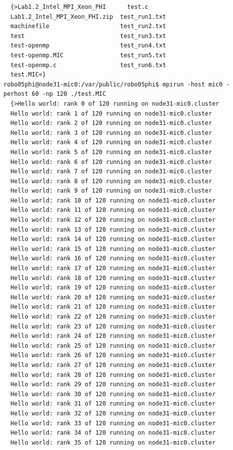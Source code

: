 \documentclass[pscyr,10pt]{hedlab}
\begin{document}
\begin{lstlisting}
  {>Lab1.2_Intel_MPI_Xeon_PHI      test.c
  Lab1.2_Intel_MPI_Xeon_PHI.zip  test_run1.txt
  machinefile                    test_run2.txt
  test                           test_run3.txt
  test-openmp                    test_run4.txt
  test-openmp.MIC                test_run5.txt
  test-openmp.c                  test_run6.txt
  test.MIC<}
robo05phi@node31-mic0:/var/public/robo05phi$ mpirun -host mic0 -perhost 60 -np 120 ./test.MIC
  {>Hello world: rank 0 of 120 running on node31-mic0.cluster
  Hello world: rank 1 of 120 running on node31-mic0.cluster
  Hello world: rank 2 of 120 running on node31-mic0.cluster
  Hello world: rank 3 of 120 running on node31-mic0.cluster
  Hello world: rank 4 of 120 running on node31-mic0.cluster
  Hello world: rank 5 of 120 running on node31-mic0.cluster
  Hello world: rank 6 of 120 running on node31-mic0.cluster
  Hello world: rank 7 of 120 running on node31-mic0.cluster
  Hello world: rank 8 of 120 running on node31-mic0.cluster
  Hello world: rank 9 of 120 running on node31-mic0.cluster
  Hello world: rank 10 of 120 running on node31-mic0.cluster
  Hello world: rank 11 of 120 running on node31-mic0.cluster
  Hello world: rank 12 of 120 running on node31-mic0.cluster
  Hello world: rank 13 of 120 running on node31-mic0.cluster
  Hello world: rank 14 of 120 running on node31-mic0.cluster
  Hello world: rank 15 of 120 running on node31-mic0.cluster
  Hello world: rank 16 of 120 running on node31-mic0.cluster
  Hello world: rank 17 of 120 running on node31-mic0.cluster
  Hello world: rank 18 of 120 running on node31-mic0.cluster
  Hello world: rank 19 of 120 running on node31-mic0.cluster
  Hello world: rank 20 of 120 running on node31-mic0.cluster
  Hello world: rank 21 of 120 running on node31-mic0.cluster
  Hello world: rank 22 of 120 running on node31-mic0.cluster
  Hello world: rank 23 of 120 running on node31-mic0.cluster
  Hello world: rank 24 of 120 running on node31-mic0.cluster
  Hello world: rank 25 of 120 running on node31-mic0.cluster
  Hello world: rank 26 of 120 running on node31-mic0.cluster
  Hello world: rank 27 of 120 running on node31-mic0.cluster
  Hello world: rank 28 of 120 running on node31-mic0.cluster
  Hello world: rank 29 of 120 running on node31-mic0.cluster
  Hello world: rank 30 of 120 running on node31-mic0.cluster
  Hello world: rank 31 of 120 running on node31-mic0.cluster
  Hello world: rank 32 of 120 running on node31-mic0.cluster
  Hello world: rank 33 of 120 running on node31-mic0.cluster
  Hello world: rank 34 of 120 running on node31-mic0.cluster
  Hello world: rank 35 of 120 running on node31-mic0.cluster

\end{lstlisting}
\end{document}
